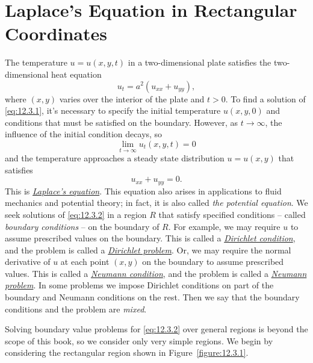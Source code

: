 \section{Laplace's Equation in Rectangular Coordinates}

\noindent
The temperature $u=u(x,y,t)$ in a two-dimensional plate satisfies the two-dimensional heat equation
\begin{equation}
  \label{eq:12.3.1}u_{t}=a^{2}(u_{xx}+u_{yy}),
\end{equation}
where $(x,y)$ varies over the interior of the plate and $t>0$. To find a solution of
\eqref{eq:12.3.1}, it's necessary to specify the initial temperature $u(x,y,0)$ and conditions that
must be satisfied on the boundary. However, as $t\to\infty$, the influence of the initial condition
decays, so
\[
  \lim_{t\to\infty}u_{t}(x,y,t)=0
\]
and the temperature approaches a steady state distribution $u=u(x,y)$ that satisfies
\begin{equation}
  \label{eq:12.3.2}u_{xx}+u_{yy}=0.
\end{equation}
This is
\href{https://mathshistory.st-andrews.ac.uk/Biographies/Laplace/}{\color{blue}
\it Laplace's equation\/}. This equation also arises in applications to fluid mechanics and
potential theory; in fact, it is also called {\color{blue}\it the potential equation\/}. We seek
solutions of \eqref{eq:12.3.2} in a region $R$ that satisfy specified conditions -- called
{\color{blue}\it boundary conditions\/} -- on the boundary of $R$. For example, we may require $u$
to assume prescribed values on the boundary. This is called a
\href{https://mathshistory.st-andrews.ac.uk/Biographies/Dirichlet/}{\color{blue}
\it Dirichlet condition}, and the problem is called a
\href{https://mathshistory.st-andrews.ac.uk/Biographies/Dirichlet/}{\color{blue}
\it Dirichlet problem\/}. Or, we may require the normal derivative of $u$ at each point $(x,y)$ on
the boundary to assume prescribed values. This is called a
\href{https://mathshistory.st-andrews.ac.uk/Biographies/Neumann_Carl/}{\color{blue}
\it Neumann condition}, and the problem is called a
\href{https://mathshistory.st-andrews.ac.uk/Biographies/Neumann_Carl/}{\color{blue}
\it Neumann problem\/}. In some problems we impose Dirichlet conditions on part of the boundary and
Neumann conditions on the rest. Then we say that the boundary conditions and the problem are
{\color{blue}\it mixed\/}.

Solving boundary value problems for \eqref{eq:12.3.2} over general regions is beyond the scope of
this book, so we consider only very simple regions. We begin by considering the rectangular region
shown in Figure~\ref{figure:12.3.1}.

